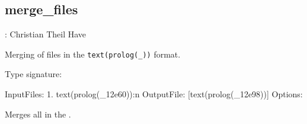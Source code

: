 


\subsection{merge_files}

\label{sec:mergefiles}

\begin{tags}
: Christian Theil Have
\end{tags}

Merging of files in the \verb$text(prolog(_))$ format.\vspace{0.7cm}

\begin{description}
Type signature:

\begin{code}
InputFiles:
    1. text(prolog(_12e60)):n
OutputFile:
    [text(prolog(_12e98))]
Options:
\end{code}

Merges all  in the .
\end{description}

